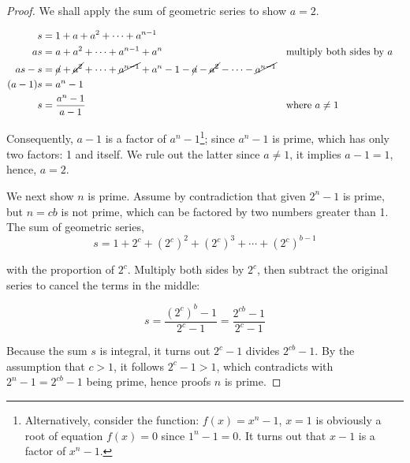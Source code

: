 \documentclass[b5paper]{article}
\begin{document}
\begin{proof}
We shall apply the sum of geometric series to show $a = 2$.

\begin{align*}
s  &= 1 + a + a^2 + \dotsb + a^{n-1}  \\
as &= a + a^2 + \dotsb + a^{n-1} + a^n && \text{multiply both sides by }a \\
as - s &= \cancel{a} + \cancel{a^2} + \dotsb + \cancel{a^{n-1}} + a^n - 1 - \cancel{a} - \cancel{a^2} - \dotsb - \cancel{a^{n-1}} \\
(a - 1)s &= a^n - 1 \\
 s &= \frac{a^n - 1}{a - 1} && \text{where } a \ne 1
\end{align*}

Consequently, $a - 1$ is a factor of $a^n - 1$\footnote{Alternatively, consider the function: $f(x) = x^n - 1$, $x = 1$ is obviously a root of equation $f(x) = 0$ since $1^n - 1 = 0$. It turns out that $x-1$ is a factor of $x^n - 1$.}; since $a^n - 1$ is prime, which has only two factors: 1 and itself. We rule out the latter since $a \ne 1$, it implies $a - 1 = 1$, hence, $a = 2$.

We next show $n$ is prime. Assume by contradiction that given $2^n - 1$ is prime, but $n = cb$ is not prime, which can be factored by two numbers greater than 1. The sum of geometric series,
\[
s = 1 + 2^c + (2^c)^2 + (2^c)^3 + \dotsb + (2^c)^{b-1}
\]

with the proportion of $2^c$. Multiply both sides by $2^c$, then subtract the original series to cancel the terms in the middle:

\[
s = \frac{(2^c)^b - 1}{2^c - 1} = \frac{2^{cb} - 1}{2^c - 1}
\]

Because the sum $s$ is integral, it turns out $2^c - 1$ divides $2^{cb} - 1$. By the assumption that $c > 1$, it follows $2^c - 1 > 1$, which contradicts with $2^n - 1 = 2^{cb} - 1$ being prime, hence proofs $n$ is prime.
\end{proof}
\end{document}
